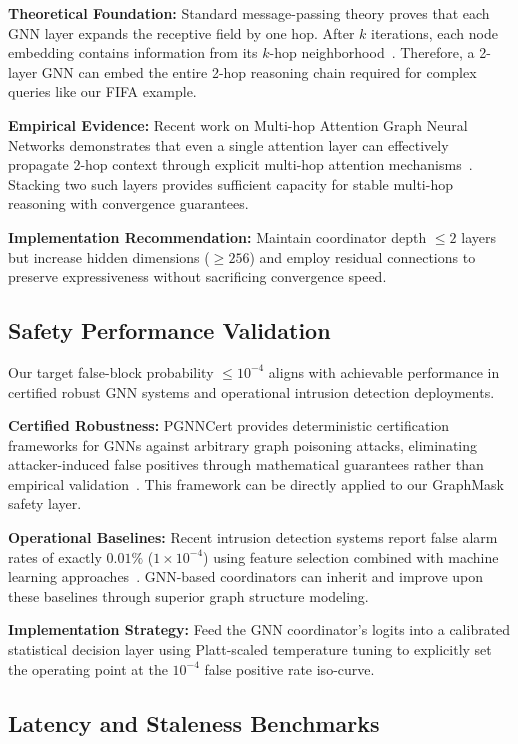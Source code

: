 \documentclass{article}
\begin{document}
\textbf{Theoretical Foundation:} Standard message-passing theory proves that each GNN layer expands the receptive field by one hop. After $k$ iterations, each node embedding contains information from its $k$-hop neighborhood~\cite{hamilton2020graph}. Therefore, a 2-layer GNN can embed the entire 2-hop reasoning chain required for complex queries like our FIFA example.

\textbf{Empirical Evidence:} Recent work on Multi-hop Attention Graph Neural Networks demonstrates that even a single attention layer can effectively propagate 2-hop context through explicit multi-hop attention mechanisms~\cite{kang2024magna}. Stacking two such layers provides sufficient capacity for stable multi-hop reasoning with convergence guarantees.

\textbf{Implementation Recommendation:} Maintain coordinator depth $\leq 2$ layers but increase hidden dimensions ($\geq 256$) and employ residual connections to preserve expressiveness without sacrificing convergence speed.

\subsection{Safety Performance Validation}

Our target false-block probability $\leq 10^{-4}$ aligns with achievable performance in certified robust GNN systems and operational intrusion detection deployments.

\textbf{Certified Robustness:} PGNNCert provides deterministic certification frameworks for GNNs against arbitrary graph poisoning attacks, eliminating attacker-induced false positives through mathematical guarantees rather than empirical validation~\cite{zhang2025pgnn}. This framework can be directly applied to our GraphMask safety layer.

\textbf{Operational Baselines:} Recent intrusion detection systems report false alarm rates of exactly $0.01\%$ ($1 \times 10^{-4}$) using feature selection combined with machine learning approaches~\cite{sharma2025feature}. GNN-based coordinators can inherit and improve upon these baselines through superior graph structure modeling.

\textbf{Implementation Strategy:} Feed the GNN coordinator's logits into a calibrated statistical decision layer using Platt-scaled temperature tuning to explicitly set the operating point at the $10^{-4}$ false positive rate iso-curve.

\subsection{Latency and Staleness Benchmarks}
\end{document}

